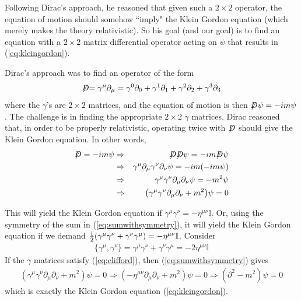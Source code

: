\documentclass[12pt,epsf]{article}
\def\nolabel{\nonumber }
\def\nolabel{\nonumber }
\begin{document}
Following Dirac's approach, he reasoned that given such a $2\times 2$
operator, the equation of motion should somehow ``imply" the Klein
Gordon equation (which merely makes the theory relativistic).  So his
goal (and our goal) is to find an equation with a $2\times 2$ matrix
differential operator acting on $\psi$ that results in
(\ref{eq:kleingordon}).  

Dirac's approach was to find an operator of the form 
\begin{eqnarray}
\not \mathrel D = \gamma^{\mu}\partial_{\mu} = \gamma^0\partial_0
+ \gamma^1\partial_1 + \gamma^2\partial_2 + \gamma^3 \partial_3\nolabel
\end{eqnarray}
where the $\gamma$'s are $2\times 2$ matrices, and the equation of
motion is then ${\displaystyle{\not}D}\psi = -im\psi$.  The challenge is
in finding the appropriate $2\times 2$ $\gamma$ matrices.  Dirac
reasoned that, in order to be properly relativistic, operating twice
with ${\displaystyle{\not}D}$ should give the Klein Gordon equation.  In
other words, 
\begin{eqnarray}
{\displaystyle{\not}D} = -im\psi &\Rightarrow& {\displaystyle{\not}D}
{\displaystyle{\not}D} \psi = -im {\displaystyle{\not}D} \psi \nolabel \\
&\Rightarrow& \gamma^{\mu}\partial_{\mu}\gamma^{\nu}\partial_{\nu}\psi
= -im(-im\psi) \nolabel \\
&\Rightarrow& \gamma^{\mu}\gamma^{\nu}\partial_{\mu}\partial_{\nu} \psi
= -m^2\psi \nolabel \\
&\Rightarrow&
\big(\gamma^{\mu}\gamma^{\nu}\partial_{\mu}\partial_{\nu}+m^2\big) \psi
= 0 \label{eq:sumwithsymmetry}
\end{eqnarray}

This will yield the Klein Gordon equation if $\gamma^{\mu}\gamma^{\nu}
= -\eta^{\mu \nu} \mathbb{I}$.	Or, using the symmetry of the sum in
(\ref{eq:sumwithsymmetry}), it will yield the Klein Gordon equation if we demand ${1\over
2}(\gamma^{\mu}\gamma^{\nu}+ \gamma^{\nu}\gamma^{\mu}) = -\eta^{\mu
\nu} \mathbb{I}$.  Consider
\begin{eqnarray}
\{\gamma^{\mu}, \gamma^{\nu}\} =
\gamma^{\mu}\gamma^{\nu}+\gamma^{\nu}\gamma^{\mu} = -2\eta^{\mu \nu}
\mathbb{I} \label{eq:clifford}
\end{eqnarray}
If the $\gamma$ matrices satisfy (\ref{eq:clifford}), then
(\ref{eq:sumwithsymmetry}) gives
\begin{eqnarray}
(\gamma^{\mu}\gamma^{\nu}\partial_{\mu}\partial_{\nu} + m^2)\psi = 0
\Rightarrow (-\eta^{\mu \nu} \partial_{\mu} \partial_{\nu} + m^2) \psi
= 0 \Rightarrow (\partial^2 - m^2)\psi = 0\nolabel
\end{eqnarray}
which is exactly the Klein Gordon equation (\ref{eq:kleingordon}).  
\end{document}
